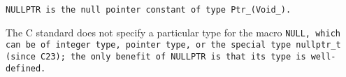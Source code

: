 \tt{NULLPTR} is the null pointer constant of type \tt{Ptr_(Void_)}.

\note The C standard does not specify a particular type for the macro \tt{NULL},
which can be of integer type, pointer type, or the special type \tt{nullptr_t}
(since C23); the only benefit of \tt{NULLPTR} is that its type is well-defined.
